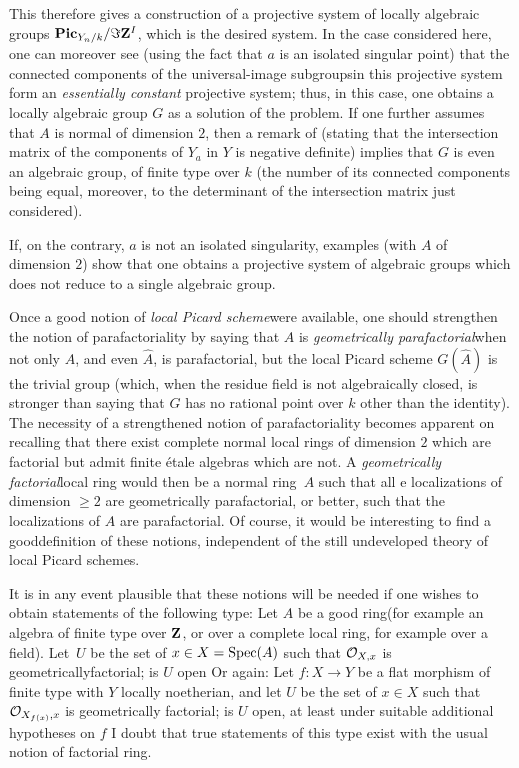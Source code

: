 This therefore gives a construction of a projective system of locally algebraic groups $\mathbf{Pic}_{Y_n/k}/\Im \mathbf Z^I$, which is the desired system. In the case considered here, one can moreover see (using the fact that $a$ is an isolated singular point) that the connected components of the universal-image subgroups\pageoriginale in this projective system form an \emph{essentially constant} projective system; thus, in this case, one obtains a locally algebraic group $G$ as a solution of the problem. If one further assumes that $A$ is normal of dimension $2$, then a remark of  (stating that the intersection matrix of the components of $Y_{a}$ in $Y$ is negative definite) implies that $G$ is even an algebraic group, \ie of finite type over $k$ (the number of its connected components being equal, moreover, to the determinant of the intersection matrix just considered).

If, on the contrary, $a$ is not an isolated singularity, examples (with $A$ of dimension $2$) show that one obtains a projective system of algebraic groups which does not reduce to a single algebraic group.

\label{pXIII20}%
Once a good notion of \og \emph{local Picard scheme}\fg were available, one should strengthen the notion of parafactoriality by saying that $A$ is \og \emph{geometrically parafactorial}\fg when not only $A$, and even $\widehat{A}$, is parafactorial, but the local Picard scheme $G(\widehat{A})$ is the trivial group (which, when the residue field is not algebraically closed, is stronger than saying that $G$ has no rational point over $k$ other than the identity). The necessity of a strengthened notion of parafactoriality becomes apparent on recalling that there exist complete normal local rings of dimension $2$ which are factorial but admit finite \'etale algebras which are not. A \og \emph{geometrically factorial}\fg local ring would then be a normal ring~$A$ such that all e localizations of dimension $\geq 2$ are geometrically parafactorial, or better, such that the localizations of $\widehat{A}$ are parafactorial. Of course, it would be interesting to find a \og good\fg definition of these notions, independent of the still undeveloped theory of local Picard schemes.

It is in any event plausible that these notions will be needed if one wishes to obtain statements of the following type: Let $A$ be a \og good ring\fg (for example an algebra of finite type over $\mathbf Z$, or over a complete local ring, for example over a field). Let~$U$ be the set of $x\in X=\operatorname{Spec}(A)$ such that $\mathcal O_{X,x}$ is \og geometrically\pageoriginale factorial\fg; is $U$ open Or again: Let $f\colon X\to Y$ be a flat morphism of finite type with $Y$ locally noetherian, and let $U$ be the set of $x\in X$ such that $\mathcal O_{X_{f(x)}, x}$ is \og geometrically factorial\fg; is $U$ open, at least under suitable additional hypotheses on $f$ I doubt that true statements of this type exist with the usual notion of factorial ring.

